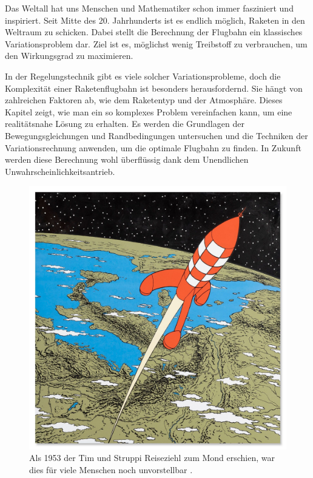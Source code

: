 %
%
%
%
Das Weltall hat uns Menschen und Mathematiker schon immer fasziniert und inspiriert. 
Seit Mitte des 20. Jahrhunderts ist es endlich möglich, Raketen in den Weltraum zu schicken. 
Dabei stellt die Berechnung der Flugbahn ein klassisches Variationsproblem dar. 
Ziel ist es, möglichst wenig Treibstoff zu verbrauchen, um den Wirkungsgrad zu maximieren.

In der Regelungstechnik gibt es viele solcher Variationsprobleme, doch die Komplexität einer Raketenflugbahn ist besonders herausfordernd. 
Sie hängt von zahlreichen Faktoren ab, wie dem Raketentyp und der Atmosphäre. 
Dieses Kapitel zeigt, wie man ein so komplexes Problem vereinfachen kann, um eine realitätsnahe Lösung zu erhalten. 
Es werden die Grundlagen der Bewegungsgleichungen und Randbedingungen untersuchen und die Techniken der Variationsrechnung anwenden, um die optimale Flugbahn zu finden. 
In Zukunft werden diese Berechnung wohl überflüssig dank dem Unendlichen Unwahrscheinlichkeitsantrieb.

\begin{figure}
	\centering
	\includegraphics[width=0.4\linewidth]{papers/leo/Grafiken/raketen_typen.jpg}
	\caption{Als 1953 der Tim und Struppi Reiseziehl zum Mond erschien, war dies für viele Menschen noch unvorstellbar \cite{leo:timstruppi}.}
	\label{fig:leo:raketen_typen}
\end{figure}








